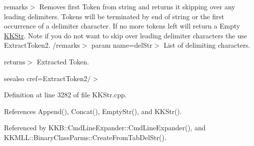 remarks$>$ Removes first Token from string and returns it skipping over any leading delimiters. Tokens will be terminated by end of string or the first occurrence of a delimiter character. If no more tokens left will return a Empty \hyperlink{class_k_k_b_1_1_k_k_str}{K\+K\+Str}. Note if you do not want to skip over leading delimiter characters the use \textquotesingle{}Extract\+Token2\textquotesingle{}. /remarks$>$ param name=\textquotesingle{}del\+Str\textquotesingle{}$>$ List of delimiting characters. 

returns$>$ Extracted Token. 

seealso cref=\textquotesingle{}Extract\+Token2\textquotesingle{}/$>$ 

Definition at line 3282 of file K\+K\+Str.\+cpp.



References Append(), Concat(), Empty\+Str(), and K\+K\+Str().



Referenced by K\+K\+B\+::\+Cmd\+Line\+Expander\+::\+Cmd\+Line\+Expander(), and K\+K\+M\+L\+L\+::\+Binary\+Class\+Parms\+::\+Create\+From\+Tab\+Del\+Str().


